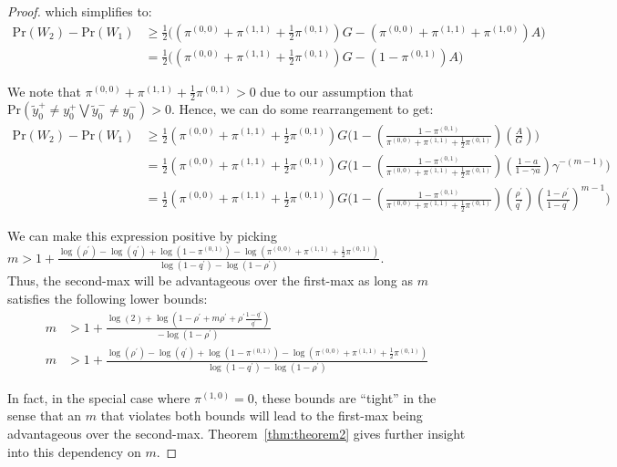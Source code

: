 \begin{proof}
which simplifies to:
\begin{align}
\textrm{Pr}(W_2) - \textrm{Pr}(W_1) &\geq \frac{1}{2} \Big(  (\pi^{(0,0)} + \pi^{(1,1)} + \frac{1}{2} \pi^{(0,1)}) G - (\pi^{(0,0)} + \pi^{(1,1)} + \pi^{(1,0)}) A \Big)\\
&= \frac{1}{2} \Big(  (\pi^{(0,0)} + \pi^{(1,1)} + \frac{1}{2} \pi^{(0,1)}) G - (1 - \pi^{(0,1)}) A \Big)
\end{align}

We note that $\pi^{(0,0)} + \pi^{(1,1)} + \frac{1}{2} \pi^{(0,1)} > 0$ due to our assumption that $\textrm{Pr}(\tilde{y}_0^{+} \neq y_0^{+} \bigvee \tilde{y}_0^{-} \neq y_0^{-}) > 0$. Hence, we can do some rearrangement to get:
\begin{align}
\textrm{Pr}(W_2) - \textrm{Pr}(W_1) &\geq \frac{1}{2} (\pi^{(0,0)} + \pi^{(1,1)} + \frac{1}{2} \pi^{(0,1)}) G \Big(1 - (\frac{1 - \pi^{(0,1)}}{\pi^{(0,0)} + \pi^{(1,1)} + \frac{1}{2} \pi^{(0,1)}}) (\frac{A}{G}) \Big)\\
&= \frac{1}{2} (\pi^{(0,0)} + \pi^{(1,1)} + \frac{1}{2} \pi^{(0,1)}) G \Big(1 - (\frac{1 - \pi^{(0,1)}}{\pi^{(0,0)} + \pi^{(1,1)} + \frac{1}{2} \pi^{(0,1)}}) (\frac{1 - a}{1 - \gamma a}) \gamma^{-(m-1)})\\
&= \frac{1}{2} (\pi^{(0,0)} + \pi^{(1,1)} + \frac{1}{2} \pi^{(0,1)}) G \Big(1 - (\frac{1 - \pi^{(0,1)}}{\pi^{(0,0)} + \pi^{(1,1)} + \frac{1}{2} \pi^{(0,1)}}) (\frac{\rho^{\prime}}{q^{\prime}}) (\frac{1 - \rho^{\prime}}{1 - q^{\prime}})^{m-1})
\end{align}

We can make this expression positive by picking $m > 1 + \frac{\log(\rho^{\prime}) - \log(q^{\prime}) + \log(1 - \pi^{(0,1)}) - \log(\pi^{(0,0)} + \pi^{(1,1)} + \frac{1}{2} \pi^{(0,1)})}{\log(1 - q^{\prime}) - \log(1 - \rho^{\prime})}$.\\

Thus, the second-max will be advantageous over the first-max as long as $m$ satisfies the following lower bounds:
\begin{align}
m &> 1 + \frac{\log(2) + \log(1 - \rho^{\prime}  + m \rho^{\prime} +  \rho^{\prime} \frac{1 - q^{\prime}}{q^{\prime}})}{-\log(1 - \rho^{\prime})}\\
m &> 1 + \frac{\log(\rho^{\prime}) - \log(q^{\prime}) + \log(1 - \pi^{(0,1)}) - \log(\pi^{(0,0)} + \pi^{(1,1)} + \frac{1}{2} \pi^{(0,1)})}{\log(1 - q^{\prime}) - \log(1 - \rho^{\prime})}
\end{align}

In fact, in the special case where $\pi^{(1,0)} = 0$, these bounds are ``tight'' in the sense that an $m$ that violates both bounds will lead to the first-max being advantageous over the second-max. Theorem~\ref{thm:theorem2} gives further insight into this dependency on $m$.

\end{proof}

